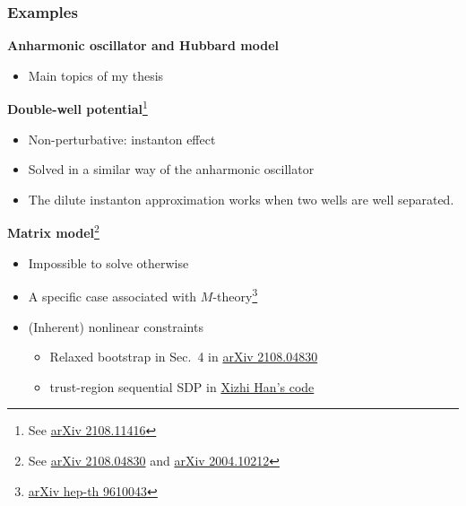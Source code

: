 \documentclass{beamer}
\begin{document}
\begin{frame}
\frametitle{Examples}

\textbf{Anharmonic oscillator and Hubbard model}

\begin{itemize}
    \item Main topics of my thesis
\end{itemize}

\textbf{Double-well potential}\footnote{See \href{https://arxiv.org/abs/2108.11416}{arXiv 2108.11416}}

\begin{itemize}
    \item Non-perturbative: instanton effect
    \item Solved in a similar way of the anharmonic oscillator
    \item The dilute instanton approximation works when two wells are well separated.
\end{itemize}

\textbf{Matrix model}\footnote{See \href{https://arxiv.org/pdf/2108.04830.pdf}{arXiv 2108.04830} and \href{https://arxiv.org/abs/2004.10212}{arXiv 2004.10212}}

\begin{itemize}
    \item Impossible to solve otherwise
    \item A specific case associated with $M$-theory\footnote{\href{https://arxiv.org/abs/hep-th/9610043}{arXiv hep-th 9610043}}
    \item (Inherent) nonlinear constraints
    \begin{itemize}
        \item Relaxed bootstrap in Sec.~4 in \href{https://arxiv.org/pdf/2108.04830.pdf}{arXiv 2108.04830}
        \item trust-region sequential SDP in \href{https://github.com/hanxzh94/matrix-bootstrap}{Xizhi Han's code}
    \end{itemize}
\end{itemize}

\end{frame}
\end{document}
